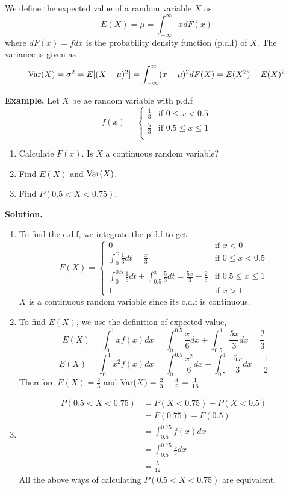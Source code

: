\begin{definition}
    We define the expected value of a random variable $X$ as
    \[E(X) = \mu = \int_{-\infty}^\infty xdF(x)\]
    where $dF(x) = fdx$ is the probability density function (p.d.f) of $X$. The variance is given as 
    \[\operatorname{Var}(X) = \sigma^2 = E[(X - \mu)^2] = \int_{-\infty}^\infty (x - \mu)^2dF(X) = E(X^2) - E(X)^2\]
\end{definition}
\noindent
\textbf{Example.} Let $X$ be ae random variable with p.d.f 
\[f(x) = \begin{cases}
    \frac{1}{3} & \text{if } 0 \leq x < 0.5\\
    \frac{5}{3} & \text{if } 0.5 \leq x \leq 1\\
\end{cases}\]
\begin{enumerate}[label=(\roman*)]
    \item Calculate $F(x)$. Is $X$ a continuous random variable?
    \item Find $E(X)$ and $\operatorname{Var}(X)$. 
    \item Find $P(0.5 < X < 0.75)$.
\end{enumerate}
\textbf{Solution.}
\begin{enumerate}[label=(\roman*)]
    \item To find the c.d.f, we integrate the p.d.f to get 
    \[F(X) = \begin{cases}
        0 & \text{if } x < 0\\
        \int_0^x \frac{1}{3}dt =\frac{x}{3} & \text{if } 0 \leq x < 0.5\\
        \int_{0}^{0.5} \frac{1}{6}dt + \int_{0.5}^x \frac{5}{3}dt = \frac{5x}{3} - \frac{2}{3} & \text{if } 0.5 \leq x \leq 1\\
        1 & \text{if } x > 1
    \end{cases}\]
    $X$ is a continuous random variable since its c.d.f is continuous. 
    \item To find $E(X)$, we use the definition of expected value,
    \[E(X) = \int_0^1 xf(x)dx = \int_0^{0.5} \frac{x}{6}dx + \int_{0.5}^1 \frac{5x}{3}dx = \frac{2}{3}\]
    \[E(X) = \int_0^1 x^2f(x)dx = \int_0^{0.5} \frac{x^2}{6}dx + \int_{0.5}^1 \frac{5x}{3}dx = \frac{1}{2}\]
    Therefore $E(X) = \frac{2}{3}$ and $\operatorname{Var}(X) = \frac{2}{3} - \frac{4}{9} = \frac{1}{16}$
    \item
    \begin{align*}
        P(0.5 < X < 0.75) &= P(X < 0.75) - P(X < 0.5)\\
        &= F(0.75) - F(0.5)\\
         &= \int_{0.5}^{0.75} f(x)dx\\
         &= \int_{0.5}^{0.75} \frac{5}{3}dx\\
         &= \frac{5}{12}  
    \end{align*}
    All the above ways of calculating $P(0.5 < X < 0.75)$ are equivalent.
\end{enumerate}

